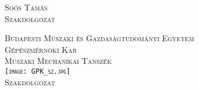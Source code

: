 \begin{titlepage}
	\cleardoublepage{}
	\begin{center}
		\scshape
		\large
		Soós Tamás
		\\
		Szakdolgozat
	\end{center}
	\thispagestyle{empty}
	
	\cleardoublepage{}
	\begin{center}
		\scshape
		\large
		Budapesti Műszaki és Gazdaságtudományi Egyetem
		\\
		Gépészmérnöki Kar
		\\
		Műszaki Mechanikai Tanszék 
		\\
		\vspace{2ex}
		\texttt{[image: GPK\_sz.jpg]}
		\\
		Szakdolgozat	
	\end{center}
	\thispagestyle{empty}
	
	\cleardoublepage{}
	\thispagestyle{empty}
	\newcommand{\HRule}{\rule{\linewidth}{0.4pt}} %
	
	\center{} %
	

\end{titlepage}
